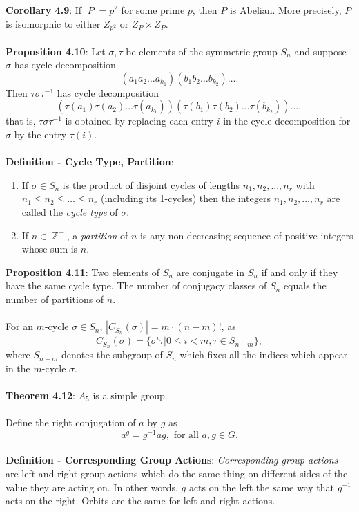\documentclass{article}
\DeclareMathOperator{\Z}{\mathbb{Z}}
\begin{document}
\textbf{Corollary 4.9}: If $|P| = p^2$ for some prime $p$, then $P$ is Abelian. More precisely, $P$ is isomorphic to either $Z_{p^2}$ or $Z_P \times Z_P$. \\ \\
\textbf{Proposition 4.10}: Let $\sigma, \tau$ be elements of the symmetric group $S_n$ and suppose $\sigma$ has cycle decomposition $$(a_1 a_2 \dots a_{k_1})(b_1 b_2 \dots b_{k_2}) \dots.$$ Then $\tau \sigma \tau^{-1}$ has cycle decomposition $$(\tau(a_1) \tau(a_2) \dots \tau(a_{k_1}))(\tau(b_1) \tau(b_2) \dots \tau(b_{k_2})) \dots,$$ that is, $\tau \sigma \tau^{-1}$ is obtained by replacing each entry $i$ in the cycle decomposition for $\sigma$ by the entry $\tau(i)$. \\ \\
\textbf{Definition - Cycle Type, Partition}: \begin{enumerate}
    \item If $\sigma \in S_n$ is the product of disjoint cycles of lengths $n_1, n_2, . .. , n_r$ with $n_1 \leq n_2 \leq \dots \leq n_r$ (including its 1-cycles) then the integers $n_1, n_2, . .. , n_r$ are called the \textit{cycle type} of $\sigma$. 
    \item If $n \in \Z^+$, a \textit{partition} of $n$ is any non-decreasing sequence of positive integers whose sum is $n$. 
\end{enumerate} $ $ \\
\textbf{Proposition 4.11}: Two elements of $S_n$ are conjugate in $S_n$ if and only if they have the same cycle type. The number of conjugacy classes of $S_n$ equals the number of partitions of $n$. \\ \\
For an $m$-cycle $\sigma \in S_n$, $|C_{S_n}(\sigma)| = m \cdot (n - m)!$, as $$C_{S_n}(\sigma) = \{\sigma^i \tau| 0 \leq i < m, \tau \in S_{n - m}\},$$ where $S_{n - m}$ denotes the subgroup of $S_n$ which fixes all the indices which appear in the $m$-cycle $\sigma$. \\ \\
\textbf{Theorem 4.12}: $A_5$ is a simple group. \\ \\
Define the right conjugation of $a$ by $g$ as $$a^g = g^{-1}ag, \text{ for all } a, g \in G.$$ \\
\textbf{Definition - Corresponding Group Actions}: \textit{Corresponding group actions} are left and right group actions which do the same thing on different sides of the value they are acting on. In other words, $g$ acts on the left the same way that $g^{-1}$ acts on the right. Orbits are the same for left and right actions. \\ \\
\end{document}
